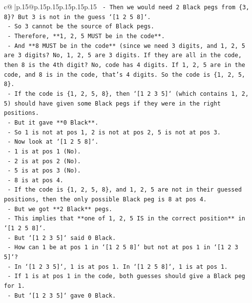 \documentclass{article}
\begin{document}
{\begin{supertabular}{c@{$\;$}|p{.15\linewidth}@{}p{.15\linewidth}p{.15\linewidth}p{.15\linewidth}p{.15\linewidth}p{.15\linewidth}}
{{{\texttt{        {-} Then we would need 2 Black pegs from \{3, 8\}? But 3 is not in the guess `{[}1 2 5 8{]}`.} \\
\texttt{        {-} So 3 cannot be the source of Black pegs.} \\
\texttt{        {-} Therefore, **1, 2, 5 MUST be in the code**.} \\
\texttt{        {-} And **8 MUST be in the code** (since we need 3 digits, and 1, 2, 5 are 3 digits? No, 1, 2, 5 are 3 digits. If they are all in the code, then 8 is the 4th digit? No, code has 4 digits. If 1, 2, 5 are in the code, and 8 is in the code, that's 4 digits. So the code is \{1, 2, 5, 8\}.} \\
\texttt{        {-} If the code is \{1, 2, 5, 8\}, then `{[}1 2 3 5{]}` (which contains 1, 2, 5) should have given some Black pegs if they were in the right positions.} \\
\texttt{        {-} But it gave **0 Black**.} \\
\texttt{        {-} So 1 is not at pos 1, 2 is not at pos 2, 5 is not at pos 3.} \\
\texttt{        {-} Now look at `{[}1 2 5 8{]}`.} \\
\texttt{        {-} 1 is at pos 1 (No).} \\
\texttt{        {-} 2 is at pos 2 (No).} \\
\texttt{        {-} 5 is at pos 3 (No).} \\
\texttt{        {-} 8 is at pos 4.} \\
\texttt{        {-} If the code is \{1, 2, 5, 8\}, and 1, 2, 5 are not in their guessed positions, then the only possible Black peg is 8 at pos 4.} \\
\texttt{        {-} But we got **2 Black** pegs.} \\
\texttt{        {-} This implies that **one of 1, 2, 5 IS in the correct position** in `{[}1 2 5 8{]}`.} \\
\texttt{        {-} But `{[}1 2 3 5{]}` said 0 Black.} \\
\texttt{        {-} How can 1 be at pos 1 in `{[}1 2 5 8{]}` but not at pos 1 in `{[}1 2 3 5{]}`?} \\
\texttt{        {-} In `{[}1 2 3 5{]}`, 1 is at pos 1. In `{[}1 2 5 8{]}`, 1 is at pos 1.} \\
\texttt{        {-} If 1 is at pos 1 in the code, both guesses should give a Black peg for 1.} \\
\texttt{        {-} But `{[}1 2 3 5{]}` gave 0 Black.} \\
}}}
\end{supertabular}}
\end{document}
